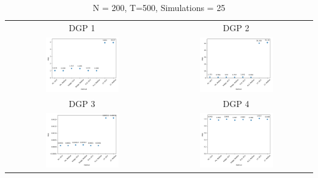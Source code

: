 \begin{table}[h! ]
    \centering
    \caption*{N = 200, T=500, Simulations = 25}
    \begin{tabular}{c c}
    DGP 1 & DGP 2 \\
        \includegraphics[width=0.5\textwidth]{figures/N200_T500_DGP1_Sims25.png} & \includegraphics[width=0.5\textwidth]{figures/N200_T500_DGP2_Sims25.png} \\
        DGP 3 & DGP 4 \\
        \includegraphics[width=0.5\textwidth]{figures/N200_T500_DGP3_Sims25} &
        \includegraphics[width=0.5\textwidth]{figures/N200_T500_DGP4_Sims25} \\

\end{tabular}
\end{table}
